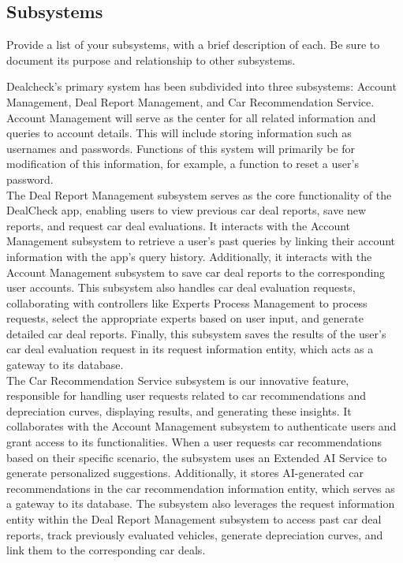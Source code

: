 \documentclass[]{article}
\begin{document}
\subsection{Subsystems}
\label{sub:subsystems}
Provide a list of your subsystems, with a brief description of each. Be sure to document its purpose and relationship to other subsystems.

Dealcheck’s primary system has been subdivided into three subsystems: Account Management, Deal Report Management, and Car Recommendation Service. \\

Account Management will serve as the center for all related information and queries to account details. This will include storing information such as usernames and passwords. Functions of this system will primarily be for modification of this information, for example, a function to reset a user’s password. \\

The Deal Report Management subsystem serves as the core functionality of the DealCheck app, enabling users to view previous car deal reports, save new reports, and request car deal evaluations. It interacts with the Account Management subsystem to retrieve a user's past queries by linking their account information with the app's query history. Additionally, it interacts with the Account Management subsystem to save car deal reports to the corresponding user accounts. This subsystem also handles car deal evaluation requests, collaborating with controllers like Experts Process Management to process requests, select the appropriate experts based on user input, and generate detailed car deal reports. Finally, this subsystem saves the results of the user's car deal evaluation request in its request information entity, which acts as a gateway to its database. \\

The Car Recommendation Service subsystem is our innovative feature, responsible for handling user requests related to car recommendations and depreciation curves, displaying results, and generating these insights. It collaborates with the Account Management subsystem to authenticate users and grant access to its functionalities. When a user requests car recommendations based on their specific scenario, the subsystem uses an Extended AI Service to generate personalized suggestions. Additionally, it stores AI-generated car recommendations in the car recommendation information entity, which serves as a gateway to its database. The subsystem also leverages the request information entity within the Deal Report Management subsystem to access past car deal reports, track previously evaluated vehicles, generate depreciation curves, and link them to the corresponding car deals.
\end{document}
